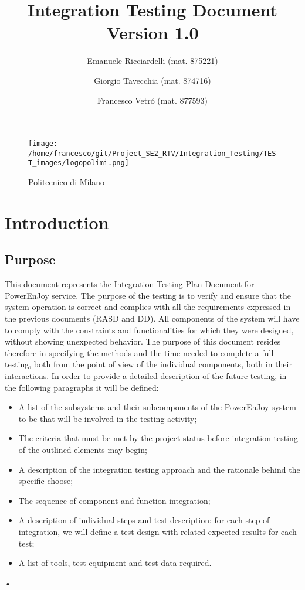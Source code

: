 \documentclass[10pt, a4paper,titlepage]{article}
\begin{document}
\begin{titlepage}
\title{Integration Testing Document \\Version 1.0}
\author{Emanuele Ricciardelli (mat. 875221) \and Giorgio Tavecchia (mat. 874716) \and Francesco Vetr\'o (mat. 877593)}
\begin{figure}
\begin{center}
\texttt{[image: /home/francesco/git/Project\_SE2\_RTV/Integration\_Testing/TEST\_images/logopolimi.png]}
\caption{Politecnico di Milano}
\label{fig:logo}
\end{center}
\end{figure}
\maketitle
\end{titlepage}
\tableofcontents
\pagebreak
\section{Introduction}
\subsection{Purpose}
This document represents the Integration Testing Plan Document for PowerEnJoy service.
The purpose of the testing is to verify and ensure that the system operation is correct and complies with all the requirements expressed in the previous documents (RASD and DD). All components of the system will have to comply with the constraints and functionalities for which they were designed, without showing unexpected behavior.
The purpose of this document resides therefore in specifying the methods and the time needed to complete a full testing, both from the point of view of the individual components, both in their interactions.
In order to provide a detailed description of the future testing, in the following paragraphs it will be defined:
\begin{itemize}
\item A list of the subsystems and their subcomponents of the PowerEnJoy system-to-be that will be involved in the testing activity;
\item The criteria that must be met by the project status before integration testing of the outlined elements may begin;
\item A description of the integration testing approach and the rationale behind the specific choose;
\item The sequence of component and function integration;
\item A description of individual steps and test description: for each step of integration, we will define a test design with related expected results for each test;
\item A list of tools, test equipment and test data required.
\end{itemize}•
\end{document}

